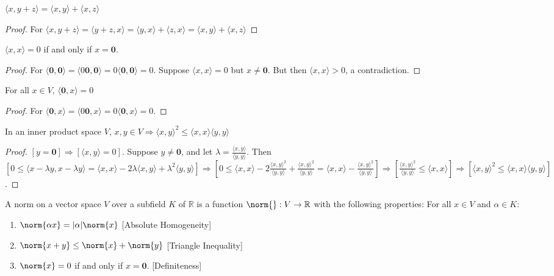 \documentclass[crop=false,class=book]{standalone}
\begin{document}
\begin{theorem}
$\langle x,y+z\rangle=\langle x,y\rangle+\langle x,z\rangle$
\end{theorem}
\begin{proof}
For $\langle x,y+z\rangle=\langle y+z,x\rangle=\langle y,x\rangle+\langle z,x\rangle=\langle x,y\rangle+\langle x,z\rangle$
\end{proof}
\begin{theorem}
$\langle x,x \rangle = 0$ if and only if $x= \mathbf{0}$.
\end{theorem}
\begin{proof}
For $\langle \mathbf{0}, \mathbf{0} \rangle = \langle 0\mathbf{0},\mathbf{0} \rangle = 0 \langle \mathbf{0},\mathbf{0}\rangle = 0$. Suppose $\langle x,x \rangle =0$ but $x\ne \mathbf{0}$. But then $\langle x,x \rangle >0$, a contradiction.
\end{proof}
\begin{corollary}
For all $x\in V$, $\langle \mathbf{0},x \rangle = 0$
\end{corollary}
\begin{proof}
For $\langle \mathbf{0}, x\rangle = \langle 0\mathbf{0},x \rangle = 0\langle \mathbf{0},x\rangle = 0$.
\end{proof}
\begin{theorem}
In an inner product space $V$, $x,y\in V\Rightarrow \langle x,y \rangle^2 \leq \langle x,x \rangle \langle y,y \rangle$
\end{theorem}
\begin{proof}
$[y=\mathbf{0}]\Rightarrow [\langle x,y\rangle = 0]$. Suppose $y\ne \mathbf{0}$, and let $\lambda = \frac{\langle x,y \rangle}{\langle y,y \rangle}$. Then $[0 \leq \langle x-\lambda y, x-\lambda y\rangle = \langle x,x \rangle - 2\lambda \langle x,y \rangle + \lambda^2 \langle y,y \rangle]\Rightarrow [0\leq \langle x,x \rangle - 2\frac{\langle x,y \rangle ^2 }{\langle y,y \rangle} + \frac{\langle x,y \rangle^2}{\langle y,y \rangle} = \langle x,x \rangle - \frac{\langle x,y \rangle^2}{\langle y,y \rangle}]\Rightarrow [\frac{\langle x,y \rangle ^2}{\langle y,y \rangle} \leq \langle x,x \rangle]\Rightarrow [\langle x,y \rangle^2 \leq \langle x,x \rangle \langle y,y \rangle]$.
\end{proof}
\begin{definition}
A norm on a vector space $V$ over a subfield $K$ of $\mathbb{R}$ is a function $\norm{}:V\rightarrow \mathbb{R}$ with the following properties: For all $x \in V$ and $\alpha \in K$:
\begin{enumerate}
\item $\norm{\alpha x} = |\alpha| \norm{x}$ \hfill [Absolute Homogeneity]
\item $\norm{x+y} \leq \norm{x}+\norm{y}$ \hfill [Triangle Inequality]
\item $\norm{x} = 0$ if and only if $x = \mathbf{0}$. \hfill [Definiteness]
\end{enumerate}
\end{definition}
\end{document}
